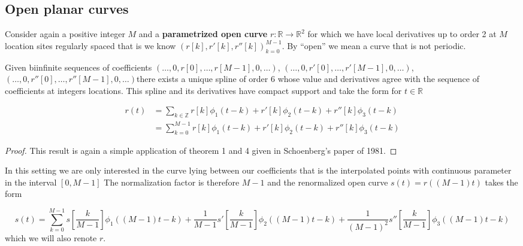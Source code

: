 \documentclass[a4paper, 11pt]{article}
\begin{document}
\subsection{Open planar curves}

Consider again a positive integer $M$ and a \textbf{parametrized open curve} $r: \mathbb{R} \to \mathbb{R}^2$ for which 
we have local derivatives up to order 2 at $M$ location sites regularly spaced that is we know ${(r[k], r'[k], 
r''[k])}_{k=0}^{M-1}$. By “open” we mean a curve that is not periodic. 

\begin{cor}{2}
  Given biinfinite sequences of coefficients $(\dots, 0, r[0], \dots, r[M-1], 0, \dots)$, $(\dots, 0, r'[0], \dots, 
  r'[M-1], 0, \dots)$, $(\dots, 0, r''[0], \dots, r''[M-1], 0, \dots)$there exists a unique spline of order $6$ 
  whose value and derivatives agree with the sequence of coefficients at integers locations. This spline and its 
  derivatives have compact support and take the form for $t \in \mathbb{R}$

  \begin{align*}
    r(t) &= \sum_{k \in \mathbb{Z}} r[k] \phi_1(t-k) + r'[k] \phi_2(t-k) + r''[k] \phi_3(t-k) \\
    &= \sum_{k=0}^{M-1} r[k] \phi_{1}(t-k) + r'[k] \phi_{2}(t-k) + r''[k] \phi_{3}(t-k)
  \end{align*}
\end{cor}

\begin{proof}
  This result is again a simple application of theorem 1 and 4 given in Schoenberg's paper of 1981.
\end{proof}

\begin{remark}{2}
  In this setting we are only interested in the curve lying between our coefficients that is the interpolated points 
  with continuous parameter in the interval $[0, M-1]$  The normalization factor is therefore $M-1$ and the renormalized 
  open curve $s(t) = r((M-1)t)$ takes the form

  \begin{equation}
    \label{eq:ocurve_no}
    s(t) = \sum_{k=0}^{M-1} s[\frac{k}{M-1}] \phi_{1}((M-1)t-k) + \frac{1}{M-1} s'[\frac{k}{M-1}] \phi_{2}((M-1)t-k) + 
  \frac{1}{(M-1)^2} s''[\frac{k}{M-1}] \phi_{3}((M-1)t-k)
  \end{equation}
  which we will also renote $r$.
\end{remark}
\end{document}
